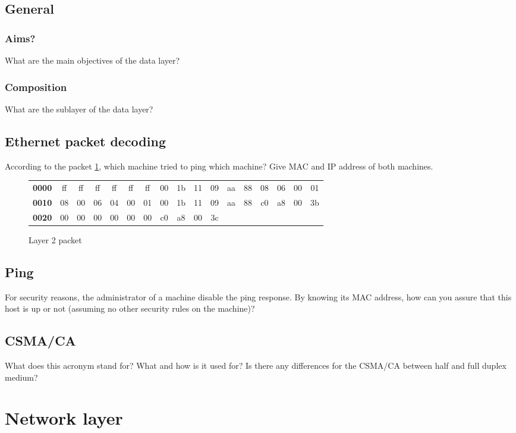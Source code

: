 \documentclass[11pt]{article}
\begin{document}
\subsection{General}
\subsubsection{Aims?}
What are the main objectives of the data layer?
\subsubsection{Composition}
What are the sublayer of the data layer?
\subsection{Ethernet packet decoding}
According to the packet \ref{fig:arp_req_ex}, which machine tried to ping which machine? Give MAC and IP address of both machines.
  \begin{figure}[h]
  \centering
  \resizebox{17cm}{!} {
    \begin{tabular}{lcccccccccccccccc}
      \textbf{0000} & ff & ff & ff & ff & ff & ff & 00 & 1b & 11 & 09 & aa & 88 & 08 & 06 & 00 & 01 \\
      \textbf{0010} & 08 & 00 & 06 & 04 & 00 & 01 & 00 & 1b & 11 & 09 & aa & 88 & c0 & a8 & 00 & 3b \\
      \textbf{0020} & 00 & 00 & 00 & 00 & 00 & 00 & c0 & a8 & 00 & 3c \\
    \end{tabular}
  }
  \caption{Layer 2 packet}
  \label{fig:arp_req_ex}
  \end{figure}
\subsection{Ping}
For security reasons, the administrator of a machine disable the ping response. By knowing its MAC address, how can you assure that this host is up or not (assuming no other security rules on the machine)?
\subsection{CSMA/CA}
What does this acronym stand for? What and how is it used for? Is there any differences for the CSMA/CA between half and full duplex medium?

\pagebreak
\section{Network layer}
\end{document}
